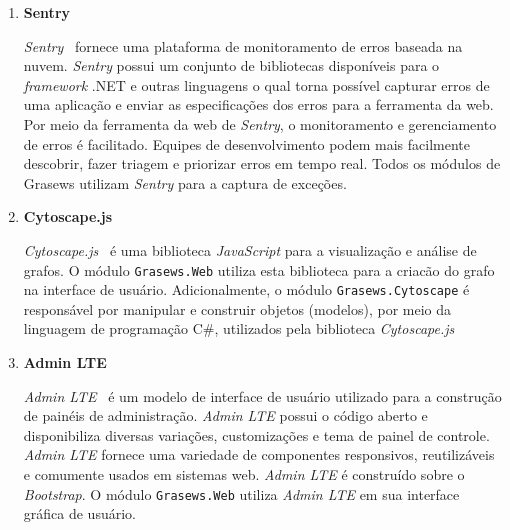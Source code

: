 \begin{enumerate}
  
  \item \textbf{Sentry}
  
  \textit{Sentry}~\cite{SENTRY-2019} fornece uma plataforma de monitoramento de erros baseada na nuvem. \textit{Sentry} possui um conjunto de bibliotecas disponíveis para o \textit{framework} .NET e outras linguagens o qual torna possível capturar erros de uma aplicação e enviar as especificações dos erros para a ferramenta da web. Por meio da ferramenta da web de \textit{Sentry}, o monitoramento e gerenciamento de erros é facilitado. Equipes de desenvolvimento podem mais facilmente descobrir, fazer triagem e priorizar erros em tempo real. Todos os módulos de Grasews utilizam \textit{Sentry} para a captura de exceções.
  
  
  \item \textbf{Cytoscape.js}
  
  \textit{Cytoscape.js}~\cite{CYTOSCAPE-2015} é uma biblioteca \textit{JavaScript} para a visualização e análise de grafos. O módulo \texttt{Grasews.Web} utiliza esta biblioteca para a criacão do grafo na interface de usuário. Adicionalmente, o módulo \texttt{Grasews.Cytoscape} é responsável por manipular e construir objetos (modelos), por meio da linguagem de programação C\#, utilizados pela biblioteca \textit{Cytoscape.js}
  
  
  \item \textbf{Admin LTE}
  
  \textit{Admin LTE}~\cite{ADMIN-LTE-2019} é um modelo de interface de usuário utilizado para a construção de painéis de administração. \textit{Admin LTE} possui o código aberto e disponibiliza diversas variações, customizações e tema de painel de controle. \textit{Admin LTE} fornece uma variedade de componentes responsivos, reutilizáveis e comumente usados em sistemas web. \textit{Admin LTE} é construído sobre o \textit{Bootstrap}. O módulo \texttt{Grasews.Web} utiliza \textit{Admin LTE} em sua interface gráfica de usuário.
  
  
  \newpage
  

\end{enumerate}
